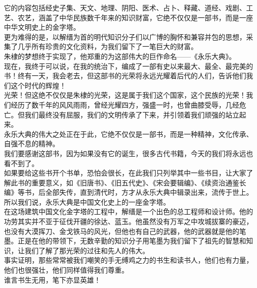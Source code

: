\begin{multicols}{\theparacolNo}
它的内容包括经史子集、天文、地理、阴阳、医术、占卜、释藏、道经、戏剧、工艺、农艺，涵盖了中华民族数千年来的知识财富，它绝不仅仅是一部书，而是一座中华文明史上的金字塔。\\

更为难得的是，以解缙为首的明代知识分子们以广博的胸怀和兼容并包的思想，采集了几乎所有珍贵的文化资料，为我们留下了一笔巨大的财富。\\

朱棣的梦想终于实现了，他郑重的为这部伟大的巨作命名——《永乐大典》。\\

现在，我终于可以说，在我的统治下，编成了一部有史以来最大、最全、最完美的书！终有一天，我会老去，但这部书的光荣将永远光耀着后代的人们，告诉他们我们这个时代的辉煌！\\

光荣！但这绝不仅仅是朱棣的光荣，这是属于我们这个国家，这个民族的光荣！我们经历了数千年的风风雨雨，曾经光耀四方，强盛一时，也曾曲膝受辱，几经危亡。但我们最终没有屈服，我们的文明传承了下来，并引领着我们顽强的站立起来。\\

永乐大典的伟大之处正在于此，它绝不仅仅是一部书，而是一种精神，文化传承、自强不息的精神。\\

我们要感谢这部书，因为如果没有它的诞生，很多古代书籍，今天的我们将永远也看不到了。\\

如果要给这些书开个书单，恐怕会很长，在此我们只列举其中一些书目，让大家了解此书的重要意义，如《旧唐书》、《旧五代史》、《宋会要辑编》、《续资治通鉴长编》等书，后全部失传，直到清代时，方才从永乐大典中辑录出来，流传于世上。\\

所以我们说，永乐大典是中国文化史上的一座金字塔。\\

在这场建筑中国文化金字塔的工程中，解缙是一个出色的总工程师和设计师。他的功劳其实并不亚于征伐开疆的徐达、蓝玉。他虽然没有万军之中攻城拔寨的豪迈，也没有大漠挥刀、金戈铁马的风光，但他也有自己的武器，他的武器就是他的笔墨。正是在他的带领下，无数辛勤的知识分子用笔墨为我们留下了祖先的智慧和知识，让我们了解了那光荣的过往和先人的伟大。\\

事实证明，那些常常被我们嘲笑的手无缚鸡之力的书生和读书人，他们也有力量，他们也很强壮，他们同样值得我们尊重。\\

谁言书生无用，笔下亦显英雄！\\


\end{multicols}
